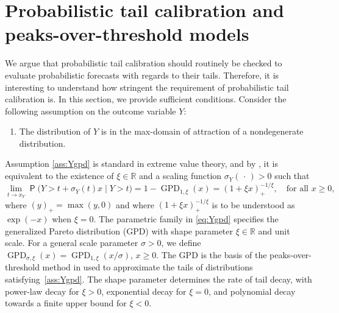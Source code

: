 \documentclass[12pt]{article}
\newcommand{\Q}{\operatorname{\mathsf{P}}}
\newcommand{\R}{\mathbb{R}}
\newcommand{\GPD}{\operatorname{GPD}} %
\newcommand{\1}{\mathbf{1}} %
\theoremstyle{definition}
\begin{document}
\section{Probabilistic tail calibration and peaks-over-threshold models}\label{sec:mda}

We argue that probabilistic tail calibration should routinely be checked to evaluate probabilistic forecasts with regards to their tails. Therefore, it is interesting to understand how stringent the requirement of probabilistic tail calibration is. In this section, we provide sufficient conditions. Consider the following assumption on the outcome variable $Y$:
\begin{enumerate}[label=(A\arabic*)]
\item \label{ass:Ygpd} 
	The distribution of $Y$ is in the max-domain of attraction of a nondegenerate distribution.
\end{enumerate}
    Assumption \ref{ass:Ygpd} is standard in extreme value theory, and by \citet{Balkema.deHaan.1974}, it is equivalent to the existence of $\xi \in \R$ and a scaling function $\sigma_Y(\,\cdot\,) > 0$ such that
	\begin{equation}
	\label{eq:Ygpd}
		\lim_{t \to x_Y} \Q \bigl(
			Y > t + \sigma_Y(t) x \mid Y > t 
		\bigr)
		= 1 - \GPD_{1,\xi}(x) 
		= (1 + \xi x)_+^{-1/\xi}, \quad \text{for all $x \ge 0$},
	\end{equation}
    where $(y)_+ = \max(y,0)$ and where $(1+\xi x)_+^{-1/\xi}$ is to be understood as $\exp(-x)$ when $\xi=0$. The parametric family in \eqref{eq:Ygpd} specifies the generalized Pareto distribution (GPD) with shape parameter $\xi \in \R$ and unit scale. For a general scale parameter $\sigma > 0$, we define $\GPD_{\sigma,\xi}(x) = \GPD_{1,\xi}(x/\sigma)$, $x \ge 0$. The GPD is the basis of the peaks-over-threshold method in \citet{Davison-Smith.1990} used to approximate the tails of distributions satisfying~\ref{ass:Ygpd}. The shape parameter determines the rate of tail decay, with power-law decay for $\xi>0$, exponential decay for $\xi=0$, and polynomial decay towards a finite upper bound for $\xi<0$.
    
\end{document}
